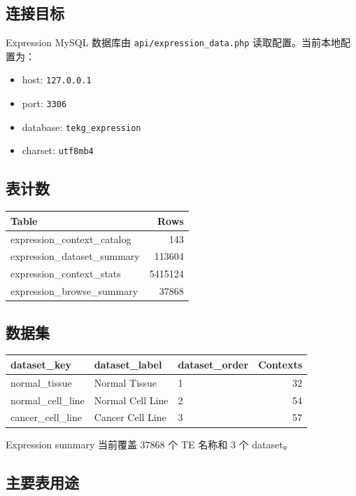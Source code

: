 \documentclass[UTF8]{ctexart}
\begin{document}
\subsection{连接目标}

Expression MySQL 数据库由 \verb|api/expression_data.php| 读取配置。当前本地配置为：

\begin{itemize}
  \item host: \texttt{127.0.0.1}
  \item port: \texttt{3306}
  \item database: \texttt{tekg\_expression}
  \item charset: \texttt{utf8mb4}
\end{itemize}

\subsection{表计数}

\begin{longtable}{lr}
\toprule
Table & Rows \\
\midrule
\endhead
expression\_context\_catalog & 143 \\
expression\_dataset\_summary & 113604 \\
expression\_context\_stats & 5415124 \\
expression\_browse\_summary & 37868 \\
\bottomrule
\end{longtable}

\subsection{数据集}

\begin{longtable}{lllr}
\toprule
dataset\_key & dataset\_label & dataset\_order & Contexts \\
\midrule
\endhead
normal\_tissue & Normal Tissue & 1 & 32 \\
normal\_cell\_line & Normal Cell Line & 2 & 54 \\
cancer\_cell\_line & Cancer Cell Line & 3 & 57 \\
\bottomrule
\end{longtable}

Expression summary 当前覆盖 37868 个 TE 名称和 3 个 dataset。

\subsection{主要表用途}
\end{document}
